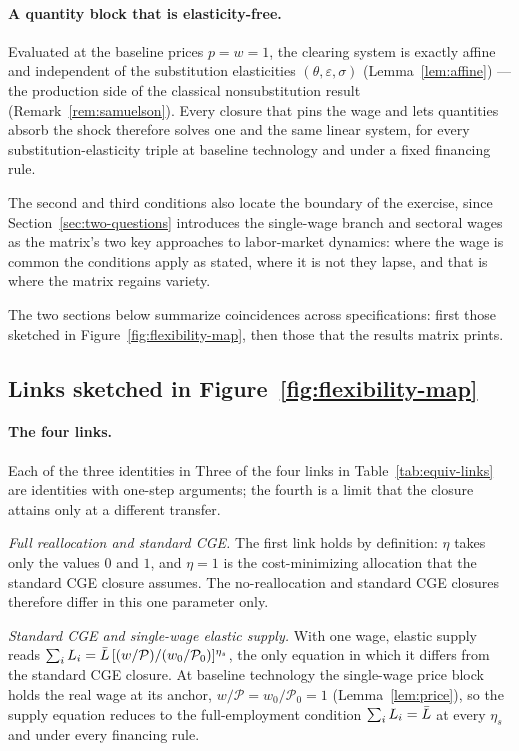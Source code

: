 \paragraph{A quantity block that is elasticity-free.} Evaluated at the baseline prices $p=w=1$, the clearing system is exactly affine and independent of the substitution elasticities $(\theta,\varepsilon,\sigma)$ (Lemma~\ref{lem:affine}) --- the production side of the classical nonsubstitution result (Remark~\ref{rem:samuelson}). Every closure that pins the wage and lets quantities absorb the shock therefore solves one and the same linear system, for every substitution-elasticity triple at baseline technology and under a fixed financing rule.

The second and third conditions also locate the boundary of the exercise, since Section~\ref{sec:two-questions} introduces the single-wage branch and sectoral wages as the matrix's two key approaches to labor-market dynamics: where the wage is common the conditions apply as stated, where it is not they lapse, and that is where the matrix regains variety.

The two sections below summarize coincidences across specifications: first those sketched in Figure~\ref{fig:flexibility-map}, then those that the results matrix prints.

\clearpage
\subsection*{Links sketched in Figure~\ref{fig:flexibility-map}}



\paragraph{The four links.} Each of the three identities in
Three of the four links in Table~\ref{tab:equiv-links} are identities with one-step arguments; the fourth is a limit that the closure attains only at a different transfer.

\emph{Full reallocation and standard CGE.} The first link holds by definition: $\eta$ takes only the values $0$ and $1$, and $\eta = 1$ is the cost-minimizing allocation that the standard CGE closure assumes. The no-reallocation and standard CGE closures therefore differ in this one parameter only.

\emph{Standard CGE and single-wage elastic supply.} With one wage, elastic supply reads $\sum_i L_i = \bar{L}\,[(w/\mathcal{P})/(w_0/\mathcal{P}_0)]^{\eta_s}$, the only equation in which it differs from the standard CGE closure. At baseline technology the single-wage price block holds the real wage at its anchor, $w/\mathcal{P} = w_0/\mathcal{P}_0 = 1$ (Lemma~\ref{lem:price}), so the supply equation reduces to the full-employment condition $\sum_i L_i = \bar{L}$ at every $\eta_s$ and under every financing rule.

